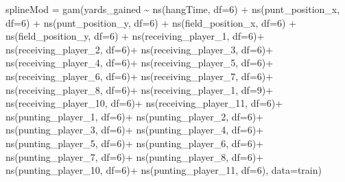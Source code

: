 \documentclass[
]{article}
\newenvironment{Shaded}{\begin{snugshade}}{\end{snugshade}}
\newcommand{\AttributeTok}[1]{\textcolor[rgb]{0.77,0.63,0.00}{#1}}
\newcommand{\DecValTok}[1]{\textcolor[rgb]{0.00,0.00,0.81}{#1}}
\newcommand{\FunctionTok}[1]{\textcolor[rgb]{0.00,0.00,0.00}{#1}}
\newcommand{\NormalTok}[1]{#1}
\newcommand{\OtherTok}[1]{\textcolor[rgb]{0.56,0.35,0.01}{#1}}
\newcommand{\SpecialCharTok}[1]{\textcolor[rgb]{0.00,0.00,0.00}{#1}}
\begin{document}
\begin{Shaded}
\begin{Highlighting}[]
\NormalTok{splineMod }\OtherTok{=} \FunctionTok{gam}\NormalTok{(yards\_gained }\SpecialCharTok{\textasciitilde{}} \FunctionTok{ns}\NormalTok{(hangTime, }\AttributeTok{df=}\DecValTok{6}\NormalTok{) }\SpecialCharTok{+} \FunctionTok{ns}\NormalTok{(punt\_position\_x, }\AttributeTok{df=}\DecValTok{6}\NormalTok{) }\SpecialCharTok{+} \FunctionTok{ns}\NormalTok{(punt\_position\_y, }\AttributeTok{df=}\DecValTok{6}\NormalTok{) }\SpecialCharTok{+} \FunctionTok{ns}\NormalTok{(field\_position\_x, }\AttributeTok{df=}\DecValTok{6}\NormalTok{) }\SpecialCharTok{+} \FunctionTok{ns}\NormalTok{(field\_position\_y, }\AttributeTok{df=}\DecValTok{6}\NormalTok{) }\SpecialCharTok{+} \FunctionTok{ns}\NormalTok{(receiving\_player\_1, }\AttributeTok{df=}\DecValTok{6}\NormalTok{)}\SpecialCharTok{+} \FunctionTok{ns}\NormalTok{(receiving\_player\_2, }\AttributeTok{df=}\DecValTok{6}\NormalTok{)}\SpecialCharTok{+} \FunctionTok{ns}\NormalTok{(receiving\_player\_3, }\AttributeTok{df=}\DecValTok{6}\NormalTok{)}\SpecialCharTok{+} \FunctionTok{ns}\NormalTok{(receiving\_player\_4, }\AttributeTok{df=}\DecValTok{6}\NormalTok{)}\SpecialCharTok{+} \FunctionTok{ns}\NormalTok{(receiving\_player\_5, }\AttributeTok{df=}\DecValTok{6}\NormalTok{)}\SpecialCharTok{+} \FunctionTok{ns}\NormalTok{(receiving\_player\_6, }\AttributeTok{df=}\DecValTok{6}\NormalTok{)}\SpecialCharTok{+} \FunctionTok{ns}\NormalTok{(receiving\_player\_7, }\AttributeTok{df=}\DecValTok{6}\NormalTok{)}\SpecialCharTok{+} \FunctionTok{ns}\NormalTok{(receiving\_player\_8, }\AttributeTok{df=}\DecValTok{6}\NormalTok{)}\SpecialCharTok{+} \FunctionTok{ns}\NormalTok{(receiving\_player\_1, }\AttributeTok{df=}\DecValTok{9}\NormalTok{)}\SpecialCharTok{+} \FunctionTok{ns}\NormalTok{(receiving\_player\_10, }\AttributeTok{df=}\DecValTok{6}\NormalTok{)}\SpecialCharTok{+} \FunctionTok{ns}\NormalTok{(receiving\_player\_11, }\AttributeTok{df=}\DecValTok{6}\NormalTok{)}\SpecialCharTok{+} \FunctionTok{ns}\NormalTok{(punting\_player\_1, }\AttributeTok{df=}\DecValTok{6}\NormalTok{)}\SpecialCharTok{+} \FunctionTok{ns}\NormalTok{(punting\_player\_2, }\AttributeTok{df=}\DecValTok{6}\NormalTok{)}\SpecialCharTok{+} \FunctionTok{ns}\NormalTok{(punting\_player\_3, }\AttributeTok{df=}\DecValTok{6}\NormalTok{)}\SpecialCharTok{+} \FunctionTok{ns}\NormalTok{(punting\_player\_4, }\AttributeTok{df=}\DecValTok{6}\NormalTok{)}\SpecialCharTok{+} \FunctionTok{ns}\NormalTok{(punting\_player\_5, }\AttributeTok{df=}\DecValTok{6}\NormalTok{)}\SpecialCharTok{+} \FunctionTok{ns}\NormalTok{(punting\_player\_6, }\AttributeTok{df=}\DecValTok{6}\NormalTok{)}\SpecialCharTok{+} \FunctionTok{ns}\NormalTok{(punting\_player\_7, }\AttributeTok{df=}\DecValTok{6}\NormalTok{)}\SpecialCharTok{+} \FunctionTok{ns}\NormalTok{(punting\_player\_8, }\AttributeTok{df=}\DecValTok{6}\NormalTok{)}\SpecialCharTok{+} \FunctionTok{ns}\NormalTok{(punting\_player\_10, }\AttributeTok{df=}\DecValTok{6}\NormalTok{)}\SpecialCharTok{+} \FunctionTok{ns}\NormalTok{(punting\_player\_11, }\AttributeTok{df=}\DecValTok{6}\NormalTok{), }\AttributeTok{data=}\NormalTok{train)}


\end{Highlighting}
\end{Shaded}
\end{document}
